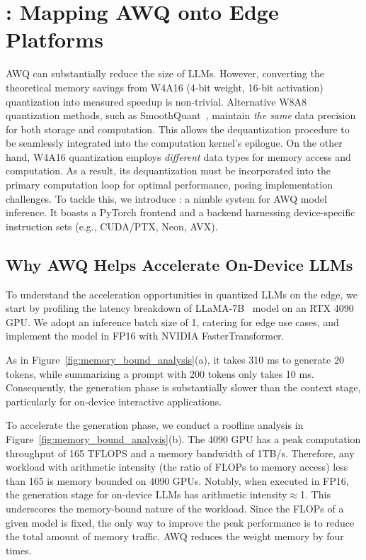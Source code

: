 \section{\system: Mapping AWQ onto Edge Platforms}


AWQ can substantially reduce the size of LLMs. However, converting the theoretical memory savings from W4A16 (4-bit weight, 16-bit activation) quantization into measured speedup is non-trivial. Alternative W8A8 quantization methods, such as SmoothQuant~\cite{xiao2022smoothquant}, maintain \textit{the same} data precision for both storage and computation. This allows the dequantization procedure to be seamlessly integrated into the computation kernel's epilogue. On the other hand, W4A16 quantization employs \textit{different} data types for memory access and computation. As a result, its dequantization must be incorporated into the primary computation loop for optimal performance, posing implementation challenges. To tackle this, we introduce \system: a nimble system for AWQ model inference. It boasts a PyTorch frontend and a backend harnessing device-specific instruction sets (e.g., CUDA/PTX, Neon, AVX).

\subsection{Why AWQ Helps Accelerate On-Device LLMs}




To understand the acceleration opportunities in quantized LLMs on the edge, we start by profiling the latency breakdown of LLaMA-7B~\cite{touvron2023llama} model on an RTX 4090 GPU. We adopt an inference batch size of 1, catering for edge use cases, and implement the model in FP16 with NVIDIA FasterTransformer. 

 As in Figure~\ref{fig:memory_bound_analysis}(a), it takes 310 ms to generate 20 tokens, while summarizing a prompt with 200 tokens only takes 10 ms. Consequently, the generation phase is substantially slower than the context stage, particularly for on-device interactive applications. 

 To accelerate the generation phase, we conduct a roofline analysis in Figure~\ref{fig:memory_bound_analysis}(b). The 4090 GPU has a peak computation throughput of 165 TFLOPS and a memory bandwidth of 1TB/s. Therefore, any workload with arithmetic intensity (the ratio of FLOPs to memory access) less than 165 is  memory bounded on 4090 GPUs. Notably, when executed in FP16, the generation stage for on-device LLMs has arithmetic intensity$\approx$1. This underscores the memory-bound nature of the workload. Since the FLOPs of a given model is fixed, the only way to improve the peak performance is to reduce the total amount of memory traffic. AWQ reduces the weight memory by four times. 


